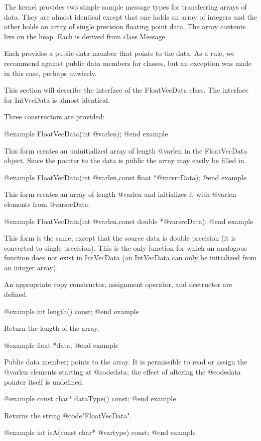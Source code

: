 The kernel provides two simple sample message types for transferring
arrays of data.  They are almost identical except that one holds an
array of integers and the other holds an array of single precision
floating point data.  The array contents live on the heap.  Each is
derived from class Message.

Each provides a public data member that points to the data.  As a rule,
we recommend against public data members for classes, but an exception
was made in this case, perhaps unwisely.

This section will describe the interface of the FloatVecData class.
The interface for IntVecData is almost identical.

Three constructors are provided:

@example
FloatVecData(int @var{len});
@end example

This form creates an uninitialized array of length @var{len} in the
FloatVecData object.  Since the pointer to the data is public the
array may easily be filled in.

@example
FloatVecData(int @var{len},const float *@var{srcData});
@end example

This form creates an array of length @var{len} and initializes it with
@var{len} elements from @var{srcData}.

@example
FloatVecData(int @var{len},const double *@var{srcData});
@end example

This form is the same, except that the source data is double precision
(it is converted to single precision).  This is the only function for
which an analogous function does not exist in IntVecData (an IntVecData
can only be initialized from an integer array).

An appropriate copy constructor, assignment operator, and destructor
are defined.

@example
int length() const;
@end example

Return the length of the array.

@example
float *data;
@end example

Public data member; points to the array.  It is permissible to read or
assign the @var{len} elements starting at @code{data}; the effect of
altering the @code{data} pointer itself is undefined.

@example
const char* dataType() const;
@end example

Returns the string @code{"FloatVecData"}.

@example
int isA(const char* @var{type}) const;
@end example


